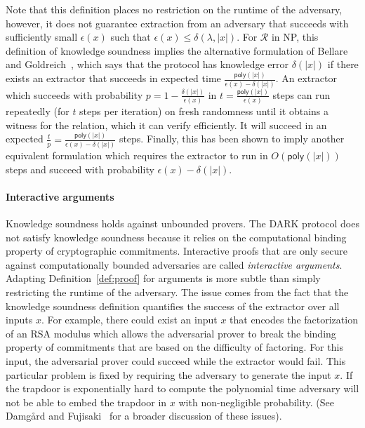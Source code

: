 \begin{remark} Note that this definition places no restriction on the runtime of the adversary, however, it does not guarantee extraction from an adversary that succeeds with sufficiently small $\epsilon(x)$ such that $\epsilon(x) \leq  \delta(\lambda, |x|)$. For $\mathcal{R}$ in NP, this definition of knowledge soundness implies the alternative formulation of Bellare and Goldreich~\cite{C:BelGol92}, which says that the protocol has knowledge error $\delta(|x|)$ if there exists an extractor that succeeds in expected time $\frac{\textsf{poly}(|x|)}{\epsilon(x) - \delta(|x|)}$. An extractor which succeeds with probability $p = 1 - \frac{\delta(|x|)}{\epsilon(x)}$ in $t = \frac{\mathsf{poly}(|x|)}{\epsilon(x)}$ steps can run repeatedly (for $t$ steps per iteration) on fresh randomness until it obtains a witness for the relation, which it can verify efficiently. It will succeed in an expected $\frac{t}{p} =  \frac{\textsf{poly}(|x|)}{\epsilon(x) - \delta(|x|)}$ steps. Finally, this has been shown to imply another equivalent formulation which requires the extractor to run in $O(\textsf{poly}(|x|))$ steps and succeed with probability $\epsilon(x) - \delta(|x|)$.  
\end{remark}
 \fi 

\paragraph{Interactive arguments} Knowledge soundness holds against unbounded provers. The DARK protocol does not satisfy knowledge soundness because it relies on the computational binding property of cryptographic commitments. Interactive proofs that are only secure against computationally bounded adversaries are called \emph{interactive arguments}. Adapting Definition~\ref{def:proof} for arguments is more subtle than simply restricting the runtime of the adversary. The issue comes from the fact that the knowledge soundness definition quantifies the success of the extractor over all inputs $x$. For example, there could exist an input $x$ that encodes the factorization of an RSA modulus which allows the adversarial prover to break the binding property of commitments that are based on the difficulty of factoring. For this input, the adversarial prover could succeed while the extractor would fail. This particular problem is fixed by requiring the adversary to generate the input $x$. If the trapdoor is exponentially hard to compute the polynomial time adversary will not be able to embed the trapdoor in $x$ with non-negligible probability.  (See Damg\r{a}rd and Fujisaki~\cite{AC:DamFuj02} for a broader discussion of these issues).



